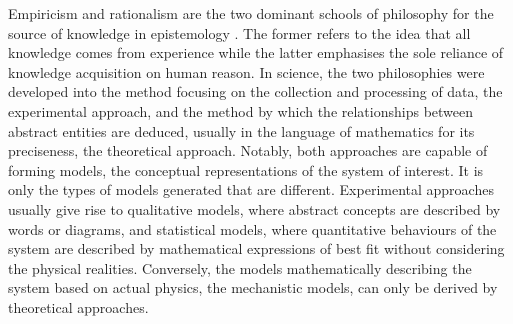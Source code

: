 Empiricism and rationalism are the two dominant schools of philosophy for the source of knowledge in epistemology \citep{Solomon2006ThePhilosophy}. The former refers to the idea that all knowledge comes from experience while the latter emphasises the sole reliance of knowledge acquisition on human reason. In science, the two philosophies were developed into the method focusing on the collection and processing of data, the experimental approach, and the method by which the relationships between abstract entities are deduced, usually in the language of mathematics for its preciseness, the theoretical approach. 
Notably, both approaches are capable of forming models, the conceptual representations of the system of interest. It is only the types of models generated that are different. Experimental approaches usually give rise to qualitative models, where abstract concepts are described by words or diagrams, and statistical models, where quantitative behaviours of the system are described by mathematical expressions of best fit without considering the physical realities. Conversely, the models mathematically describing the system based on actual physics, the mechanistic models, can only be derived by theoretical approaches. 

